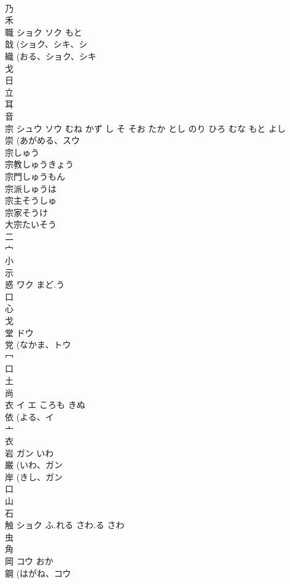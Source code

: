 \documentclass[8pt]{extreport}
\begin{document}
\begin{CJK}{UTF8}{min}
\\	乃 
\\	禾 
\\	職	ショク ソク	もと	
\\	戠 (ショク、シキ、シ 
\\	織 (おる、ショク、シキ 
\\	戈 
\\	日 
\\	立 
\\	耳 
\\	音 
\\	宗	シュウ ソウ	むね かず し そ そお たか とし のり ひろ むな もと よし	
\\	崇 (あがめる、スウ 
\\	宗しゅう 
\\	宗教しゅうきょう 
\\	宗門しゅうもん 
\\	宗派しゅうは 
\\	宗主そうしゅ 
\\	宗家そうけ 
\\	大宗たいそう 
\\	二 
\\	宀 
\\	小 
\\	示 
\\	惑	ワク	まど.う	
\\	口 
\\	心 
\\	戈 
\\	堂	ドウ		
\\	党 (なかま、トウ 
\\	冖 
\\	口 
\\	土 
\\	尚 
\\	衣	イ エ	ころも きぬ	
\\	依 (よる、イ 
\\	亠 
\\	衣 
\\	岩	ガン	いわ	
\\	巌 (いわ、ガン 
\\	岸 (きし、ガン 
\\	口 
\\	山 
\\	石 
\\	触	ショク	ふ.れる さわ.る さわ	
\\	虫 
\\	角 
\\	岡	コウ	おか	
\\	鋼 (はがね、コウ 

\end{CJK}
\end{document}
